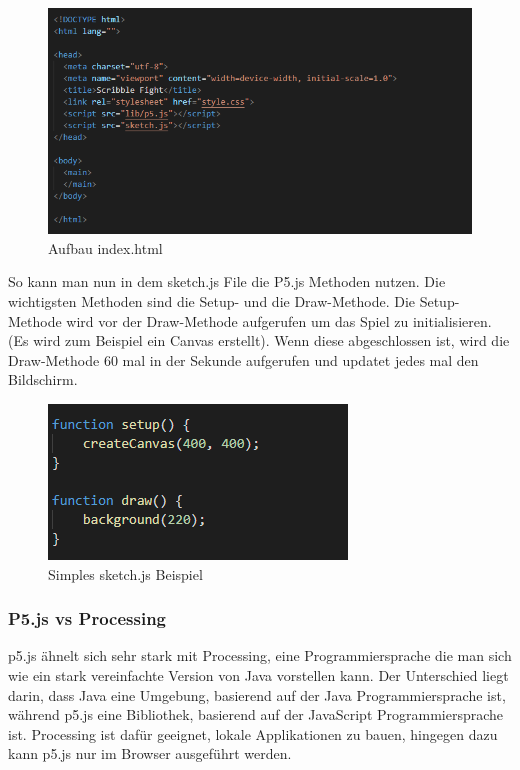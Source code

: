 \begin{figure}[H]
    \centering
    \includegraphics[scale=1]{pics/index html.PNG}
    \caption{Aufbau index.html}
\end{figure}

So kann man nun in dem sketch.js File die P5.js Methoden nutzen. Die wichtigsten Methoden sind die Setup- und die Draw-Methode.
Die Setup-Methode wird vor der Draw-Methode aufgerufen um das Spiel zu initialisieren. (Es wird zum Beispiel ein Canvas erstellt).
Wenn diese abgeschlossen ist, wird die Draw-Methode 60 mal in der Sekunde aufgerufen und updatet jedes mal den Bildschirm. 

\begin{figure}[H]
    \centering
    \includegraphics[scale=1]{pics/sketch.PNG}
    \caption{Simples sketch.js Beispiel}
\end{figure}

\subsubsection{P5.js vs Processing}
p5.js ähnelt sich sehr stark mit Processing, eine Programmiersprache die man sich wie ein stark vereinfachte Version von Java vorstellen kann.
Der Unterschied liegt darin, dass Java eine Umgebung, basierend auf der Java Programmiersprache ist, während p5.js eine Bibliothek, basierend auf der JavaScript Programmiersprache ist.
Processing ist dafür geeignet, lokale Applikationen zu bauen, hingegen dazu kann p5.js nur im Browser ausgeführt werden.


